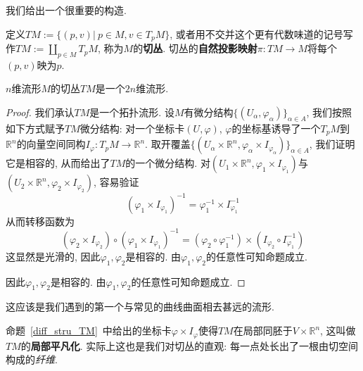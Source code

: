 我们给出一个很重要的构造.

\begin{defn}
    定义$TM:=\{(p,v)|\ p\in M,v\in T_pM\}$, 或者用不交并这个更有代数味道的记号写作$\displaystyle TM:=\coprod_{p\in M}T_pM$, 称为$M$的\textbf{切丛}.
    切丛的\textbf{自然投影映射}$\pi:TM\to M$将每个$(p,v)$映为$p$.
\end{defn}

\begin{prop}\label{diff_stru_TM}
    $n$维流形$M$的切丛$TM$是一个$2n$维流形.
\end{prop}
\begin{proof}
    我们承认$TM$是一个拓扑流形.
    设$M$有微分结构$\{(U_\alpha,\varphi_\alpha)\}_{\alpha\in A}$, 我们按照如下方式赋予$TM$微分结构:
    对一个坐标卡$(U,\varphi)$, $\varphi$的坐标基诱导了一个$T_pM$到$\mathbb{R}^n$的向量空间同构$I_\varphi:T_pM\to\mathbb{R}^n$.
    取开覆盖$\{(U_\alpha\times\mathbb{R}^n,\varphi_\alpha\times I_{\varphi_\alpha})\}_{\alpha\in A}$, 我们证明它是相容的, 从而给出了$TM$的一个微分结构.
    对$(U_1\times\mathbb{R}^n,\varphi_1\times I_{\varphi_1})$与$(U_2\times\mathbb{R}^n,\varphi_2\times I_{\varphi_2})$, 容易验证
    \[(\varphi_1\times I_{\varphi_1})^{-1}=\varphi_1^{-1}\times I_{\varphi_1}^{-1}\]
    从而转移函数为
    \[(\varphi_2\times I_{\varphi_2})\circ(\varphi_1\times I_{\varphi_1})^{-1}=(\varphi_2\circ\varphi_1^{-1})\times(I_{\varphi_2}\circ I_{\varphi_1}^{-1})\]
    这显然是光滑的, 因此$\varphi_1,\varphi_2$是相容的.
    由$\varphi_1,\varphi_2$的任意性可知命题成立.
    
    因此$\varphi_1,\varphi_2$是相容的.
    由$\varphi_1,\varphi_2$的任意性可知命题成立.
\end{proof}

这应该是我们遇到的第一个与常见的曲线曲面相去甚远的流形.

\begin{rem}
    命题~\ref{diff_stru_TM}~中给出的坐标卡$\varphi\times I_\varphi$使得$TM$在局部同胚于$V\times\mathbb{R}^n$, 这叫做$TM$的\textbf{局部平凡化}.\label{local trivialization}
    实际上这也是我们对切丛的直观: 每一点处长出了一根由切空间构成的\textit{纤维}.
\end{rem}

